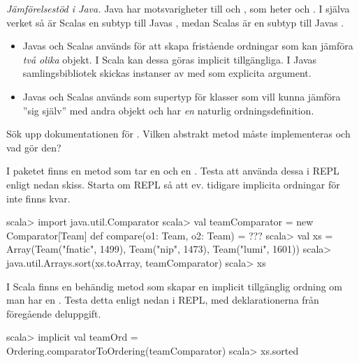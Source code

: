 \Task \emph{Jämförelsestöd i Java.} 
Java har motsvarigheter till  och , som heter  och . I själva verket så är Scalas  en subtyp till Javas , medan Scalas  är en subtyp till Javas . 
\begin{itemize}[nolistsep, noitemsep]
\item Javas  och Scalas  används för att skapa fristående ordningar som kan jämföra \emph{två olika} objekt. I Scala kan dessa göras implicit tillgängliga. I Javas samlingsbibliotek skickas instanser av  med som explicita argument.
\item Javas  och Scalas  används som supertyp för klasser som vill kunna jämföra ''sig själv'' med andra objekt och har \emph{en} naturlig ordningsdefinition.
\end{itemize}

\Subtask\Pen Sök upp dokumentationen för . Vilken abstrakt metod måste implementeras och vad gör den? 

\Subtask  I paketet  finns en metod  som tar en  och en . Testa att använda dessa i REPL enligt nedan skiss. Starta om REPL så att ev. tidigare implicita ordningar för  inte finns kvar.
\begin{REPL}
scala> import java.util.Comparator
scala> val teamComparator = new Comparator[Team]{
         def compare(o1: Team, o2: Team) = ???
       }
scala> val xs = 
         Array(Team("fnatic", 1499), Team("nip", 1473), Team("lumi", 1601))
scala> java.util.Arrays.sort(xs.toArray, teamComparator)
scala> xs
\end{REPL}

\Subtask I Scala finns en behändig metod  som skapar en implicit tillgänglig ordning om man har en . Testa detta enligt nedan i REPL, med deklarationerna från föregående deluppgift.
\begin{REPL}
scala> implicit val teamOrd = Ordering.comparatorToOrdering(teamComparator)
scala> xs.sorted
\end{REPL}



